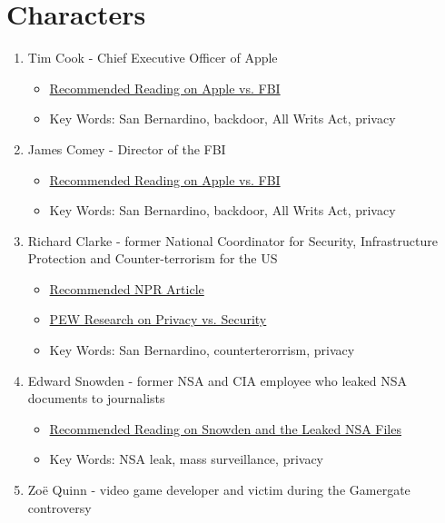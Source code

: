 \documentclass[12pt]{amsart}
\theoremstyle{plain}
\theoremstyle{definition}
\begin{document}
\section{Characters}
\begin{enumerate}[1.]
	\item Tim Cook - Chief Executive Officer of Apple
		\begin{itemize}
			\item \href{https://en.wikipedia.org/wiki/FBI\%E2\%80\%93Apple_encryption_dispute}{Recommended Reading on Apple vs. FBI}
			\item Key Words:  San Bernardino, backdoor, All Writs Act, privacy
		\end{itemize}
	\item James Comey - Director of the FBI
		\begin{itemize}
			\item \href{https://en.wikipedia.org/wiki/FBI\%E2\%80\%93Apple_encryption_dispute}{Recommended Reading on Apple vs. FBI}
			\item Key Words:  San Bernardino, backdoor, All Writs Act, privacy
		\end{itemize}
	\item Richard Clarke - former National Coordinator for Security, Infrastructure Protection and Counter-terrorism for the US
		\begin{itemize}
			\item \href{http://www.npr.org/2016/03/14/470347719/encryption-and-privacy-are-larger-issues-than-fighting-terrorism-clarke-says}{Recommended NPR Article}			
			\item \href{http://www.pewresearch.org/fact-tank/2016/02/19/americans-feel-the-tensions-between-privacy-and-security-concerns/}{PEW Research on Privacy vs. Security}			
			\item Key Words: San Bernardino, counterterorrism, privacy
		\end{itemize}
	\item Edward Snowden - former NSA and CIA employee who leaked NSA documents to journalists
		\begin{itemize}
			\item \href{https://www.theguardian.com/world/interactive/2013/nov/01/snowden-nsa-files-surveillance-revelations-decoded#section/1}{Recommended Reading on Snowden and the Leaked NSA Files}	
			\item Key Words: NSA leak, mass surveillance, privacy
		\end{itemize}
	\item Zo\"{e} Quinn - video game developer and victim during the Gamergate controversy

\end{enumerate}
\end{document}
